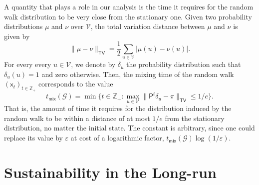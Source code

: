 \documentclass[letterpaper,11pt]{article}
\newcommand{\ZZ}{\mathbb{Z}}
\newcommand{\tv}{\mathsf{TV}}
\newcommand{\tmix}{t_{\mathsf{mix}}}
\newcommand{\psf}{\mathsf{P}}
\newcommand{\xsf}{\mathsf{x}}
\begin{document}
 A quantity that plays a role in our analysis is the time it requires for the random walk distribution to be very close from the stationary one.
Given two probability distributions $\mu$ and $\nu$ over $\mathcal{V}$, the total variation distance between $\mu$ and $\nu$ is given by
\begin{equation*}
\|\mu-\nu\|_{\tv}=\frac{1}{2}\sum_{u\in \mathcal{V}}|\mu(u)-\nu(u)|.
\end{equation*}
For every every $u\in \mathcal{V}$, we denote by $\delta_u$ the probability distribution such that $\delta_u(u)=1$ and zero otherwise. 
Then, the mixing time of the random walk $(\xsf_t)_{t\in \ZZ_+}$ corresponds to the value
\begin{equation*}
\tmix(\mathcal{G})=\min\Big\{t\in \ZZ_+:\max_{u\in \mathcal{V}}\|\psf^t\delta_u-\pi\|_{\tv}\le 1/e\Big\}.
\end{equation*}
That is, the amount of time it requires for the distribution induced by the random walk to be within a distance of at most $1/e$ from the stationary distribution, no matter the initial state.
The constant is arbitrary, since one could replace its value by $\varepsilon$ at cost of a logarithmic factor, $\tmix(\mathcal{G})\log(1/\varepsilon)$.

\section{Sustainability in the Long-run}
\end{document}
